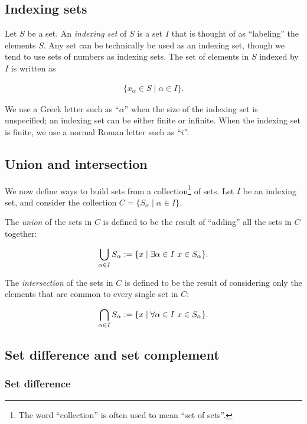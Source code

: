 \subsection*{Indexing sets}

Let $S$ be a set. An \textit{indexing set} of $S$ is a set $I$ that is thought of as ``labeling'' the elements $S$. Any set can be technically be used as an indexing set, though we tend to use sets of numbers as indexing sets. The set of elements in $S$ indexed by $I$ is written as

\begin{align*}
    \{ x_\alpha \in S \mid \alpha \in I \}.
\end{align*}

We use a Greek letter such as ``$\alpha$'' when the size of the indexing set is unspecified; an indexing set can be either finite or infinite. When the indexing set is finite, we use a normal Roman letter such as ``$i$''.

\subsection*{Union and intersection}

We now define ways to build sets from a collection\footnote{The word ``collection'' is often used to mean ``set of sets''.} of sets. Let $I$ be an indexing set, and consider the collection $C = \{S_\alpha \mid \alpha \in I \}$.

The \textit{union} of the sets in $C$ is defined to be the result of ``adding'' all the sets in $C$ together:

\begin{align*}
    \bigcup_{\alpha \in I} S_\alpha := \{ x \mid \exists \alpha \in I \text{ } x \in S_\alpha \}.
\end{align*}

The \textit{intersection} of the sets in $C$ is defined to be the result of considering only the elements that are common to every single set in $C$:

\begin{align*}
    \bigcap_{\alpha \in I} S_\alpha := \{ x \mid \forall \alpha \in I \text{ } x \in S_\alpha \}.
\end{align*}

\subsection*{Set difference and set complement}

\subsubsection*{Set difference}

